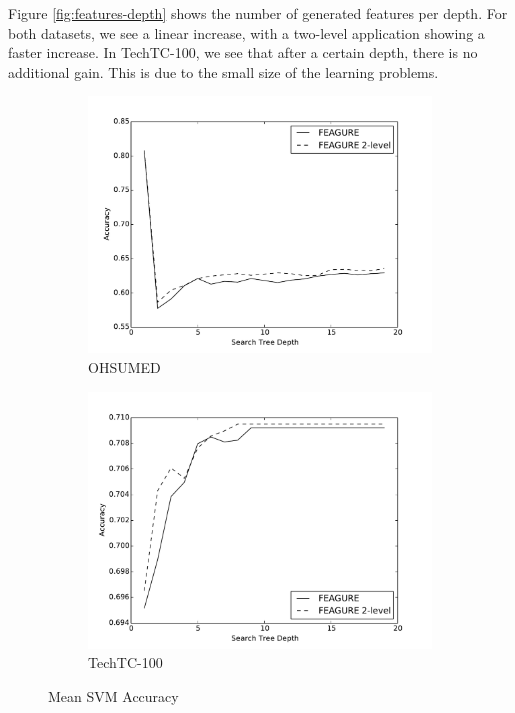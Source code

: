 \documentclass[twoside,11pt]{article}
\theoremstyle{definition}
\begin{document}
Figure \ref{fig:features-depth} shows the number of generated features per depth.  For both datasets, we see a linear increase, with a two-level application showing a faster increase. In TechTC-100, we see that after a certain depth, there is no additional gain. This is due to the small size of the learning problems.

\begin{figure}
	\centering
	\begin{subfigure}{.55\textwidth}
		\centering
		\includegraphics[width=1.1\linewidth]{new_depth_ohsumed.pdf}
		\caption{OHSUMED}
		\label{fig:svm-ohsumed}
	\end{subfigure}%
	\begin{subfigure}{.55\textwidth}
		\centering
		\includegraphics[width=1.1\linewidth]{new_depth_005_techtc.pdf}
		\caption{TechTC-100}
		\label{fig:svm-techtc}
	\end{subfigure}
	\caption{Mean SVM Accuracy}
	\label{fig:svm-acc}
\end{figure}
\end{document}
